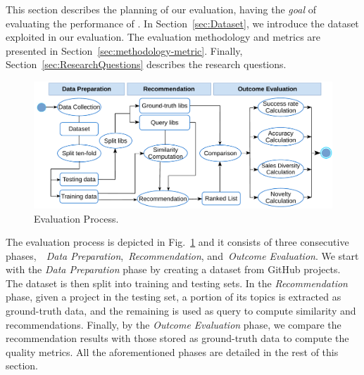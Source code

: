 





This section describes the planning of our evaluation, having the {\em goal} of evaluating the performance of \CR. In Section~\ref{sec:Dataset}, we introduce the dataset exploited in our evaluation. The evaluation methodology and metrics are presented in Section~\ref{sec:methodology-metric}. Finally, Section~\ref{sec:ResearchQuestions} describes the research questions.



\begin{figure}[h!]
	\centering
	\includegraphics[width=\linewidth]{figs/EvaluationProcess.pdf}
	\caption{Evaluation Process.}
	\label{fig:EvaluationProcess}
	\vspace{-.3cm}
\end{figure}

The evaluation process is depicted in Fig.~\ref{fig:EvaluationProcess} and it consists of three consecutive phases,~\ie~\emph{Data Preparation},~\emph{Recommendation}, and~\emph{Outcome Evaluation}. We start with the \emph{Data Preparation} phase by creating a dataset from  GitHub projects. %
The dataset is then split into training and testing sets.  In the \emph{Recommendation} phase, given a project in the testing set, a portion of its topics is extracted as ground-truth data, and the remaining is used as query to compute similarity and recommendations. Finally, by the \emph{Outcome Evaluation} phase, we compare the recommendation results with those stored as ground-truth data to compute the quality metrics. All the aforementioned phases are  detailed in the rest of this section.


